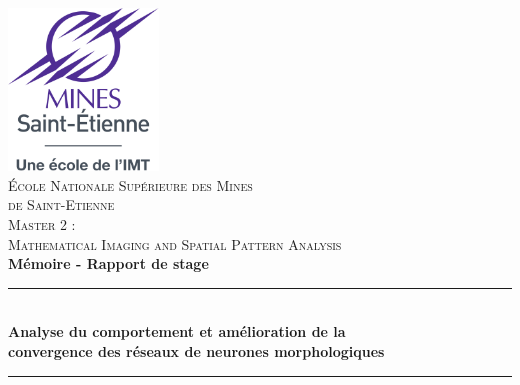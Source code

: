 \begin{titlepage}

\newcommand{\HRule}{\rule{\linewidth}{0.5mm}} %


\begin{center} %
\includegraphics[width = 4.0cm, trim = {0 8.0cm 0 0.1cm}, clip]{./figures/emse_logo}\\[0.8cm] 


\textsc{\textsc{\Large École Nationale Supérieure des Mines}}\\[0.16cm] 
\textsc{\textsc{\Large de Saint-Etienne}}\\[0.7cm] 
\textsc{\large Master 2 :}\\[0.16cm] 
\textsc{\large Mathematical Imaging and Spatial Pattern Analysis}\\[0.9cm] 
\textbf{\Large Mémoire - Rapport de stage}\\[0.7cm] 


\HRule \\[0.0cm]
\vspace{5mm}
{ \Large \bfseries Analyse du comportement et amélioration de la}\\ %
\vspace{0.8mm}
{ \Large \bfseries convergence des réseaux de neurones morphologiques}\\ %
\vspace{2mm}
\HRule \\[1.2cm]
\end{center}


\end{titlepage}
